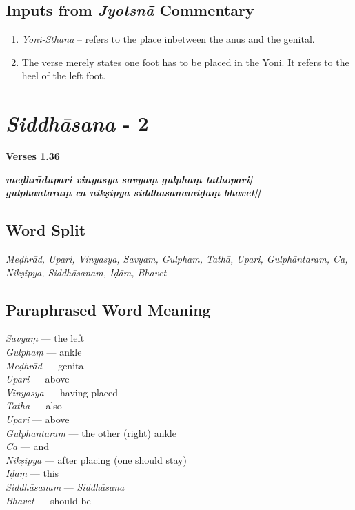 \subsection*{Inputs from \textit{Jyotsnā} Commentary}

\begin{enumerate}
\item \textit{Yoni-Sthana} – refers to the place inbetween the anus and the genital. 
\item The verse merely states one foot has to be placed in the Yoni. It refers to the heel of the left foot. 
\end{enumerate}

\section*{\textit{Siddhāsana} - 2}

\noindent 
\textbf{Verses 1.36}

\begin{shloka}
\textit{\textbf{meḍhrādupari vinyasya savyaṃ gulphaṃ tathopari|}\\
\textbf{gulphāntaraṃ ca nikṣipya siddhāsanamiḍāṃ bhavet||}}
\end{shloka}

\subsection*{Word Split}

\textit{Meḍhrād, Upari, Vinyasya, Savyam, Gulpham, Tathā, Upari, Gulphāntaram, Ca, Nikṣipya, Siddhāsanam, Iḍām, Bhavet}

\subsection*{Paraphrased Word Meaning}

\begin{multicols}{2}
\textit{Savyaṃ} --- the left  \\
\textit{Gulphaṃ} --- ankle  \\
\textit{Meḍhrād} --- genital  \\ 
\textit{Upari} ---  above  \\
\textit{Vinyasya} --- having placed  \\
\textit{Tatha} --- also  \\
\textit{Upari} --- above  \\
\textit{Gulphāntaraṃ} --- the other (right) ankle  \\
\textit{Ca} --- and  \\
\textit{Nikṣipya} ---  after placing (one should stay) \\
\textit{Iḍāṃ} --- this \\
\textit{Siddhāsanam} --- \textit{Siddhāsana} \\
\textit{Bhavet} ---  should be
\end{multicols}
  
